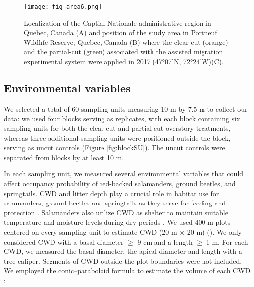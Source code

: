 \begin{figure}[ht!]
	\centering
	\texttt{[image: fig\_area6.png]}
	\caption[Localization of the Capitale-Nationale administrative region in Quebec, Canada and position of the study area near Lac des Amanites in Portneuf Wildlife Reserve, Quebec, Canada.]
  {Localization of the Captial-Nationale administrative region in Quebec, Canada (A) and position of the study area in Portneuf Wildlife Reserve, Quebec, Canada (B) where the clear-cut (orange) and the partial-cut (green) associated with the assisted migration experimental system were applied in 2017 (47°07'N, 72°24'W)(C).}
	\label{fig:area}
	\end{figure}  


\subsection*{Environmental variables}
\label{subsec:EnvVar}

We selected a total of 60 sampling units measuring 10 m by 7.5 m to collect our data: we used four blocks serving as replicates, 
with each block containing six sampling units for both the clear-cut and partial-cut overstory treatments, 
whereas three additional sampling units were positioned outside the block, serving as uncut controls (Figure \ref*{fig:blockSU}). 
The uncut controls were separated from blocks by at least 10 m. 

In each sampling unit, we measured several environmental variables that could affect occupancy probability of red-backed salamanders, ground beetles, and springtails.
CWD and litter depth play a crucial role in habitat use for salamanders, ground beetles and springtails as
they serve for feeding and protection  \citep{harmonEcologyCoarseWoody1986,koivula.LeafLitterSmallscale1999,birdChangesSoilLitter2004,mckennyEffectsStructuralComplexity2006}. 
Salamanders also utilize CWD as shelter to maintain suitable temperature and moisture levels during dry periods \citep{Jaeger1980MicrohabitatsTerrestrial,groverInfluenceCoverMoisture1998a,patrickEffectsExperimentalForestry2006a}.
We used 400 m plots centered on every sampling unit to estimate CWD (20 m $\times$  20 m) (\citealp{methotGuideInventaireEchantillonnage2014}). 
We only considered CWD with a basal diameter $\geq$ 9 cm and a length $\geq$ 1 m.
For each CWD, we measured the basal diameter, the apical diameter and length with a tree caliper.
Segments of CWD outside the plot boundaries were not included.
We employed the conic–paraboloid formula to estimate the volume of each CWD \citep{fraverRefiningVolumeEstimates2007} :

